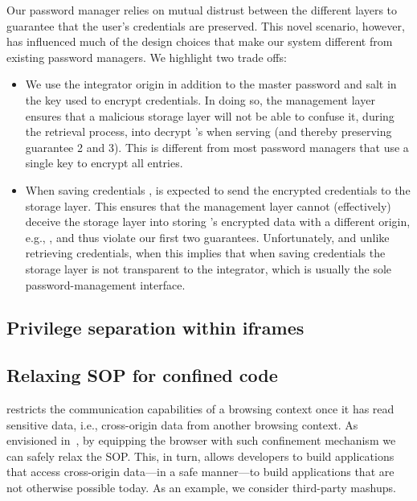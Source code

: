 Our password manager relies on mutual distrust between the different
layers to guarantee that the user's credentials are preserved.
%
This novel scenario, however, has influenced much of the design
choices that make our system different from existing password
managers.
%
We highlight two trade offs:
\begin{itemize}
\item
We use the integrator origin in addition to the master
password and salt in the key used to encrypt credentials.
%
In doing so, the management layer ensures that a malicious storage
layer will not be able to confuse it, during the retrieval process,
into decrypt 's when serving  (and
thereby preserving guarantee 2 and 3).
%
This is different from most password managers that use a single key
to encrypt all entries.
%
\item 
When saving credentials ,  is expected to send the
encrypted credentials to the storage layer.
%
This ensures that the management layer cannot (effectively) deceive
the storage layer into storing 's encrypted data with a
different origin, e.g., , and thus violate our first two
guarantees.
%
Unfortunately, and unlike retrieving credentials, when this implies
that when saving credentials the storage layer is not transparent to
the integrator, which is usually the sole password-management
interface.
%
\end{itemize}

\subsection{Privilege separation within iframes}
\label{sec:system:extension}


\subsection{Relaxing SOP for confined code}
\label{sec:system:mashup}
%
\sys{} restricts the communication capabilities of a
browsing context once it has read sensitive data, i.e., cross-origin
data from another browsing context.
%
As envisioned in~, by equipping the browser with such
confinement mechanism we can safely relax the SOP.
%
This, in turn, allows developers to build applications that access
cross-origin data---in a safe manner---to build applications that are
not otherwise possible today.
%
As an example, we consider third-party mashups.

